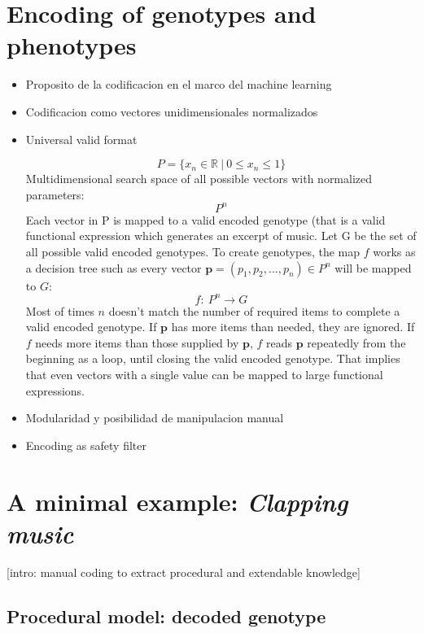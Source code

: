 \documentclass{article}
\renewcommand{\vec}[1]{\mathbf{#1}}
\begin{document}


\section{Encoding of genotypes and phenotypes}
\begin{itemize}
\item Proposito de la codificacion en el marco del machine learning
\item Codificacion como vectores unidimensionales normalizados
\item Universal valid format

$$ P = \{x_n \in \mathbb{R} \: | \: 0 \leq x_n \leq1 \} $$
Multidimensional search space of all possible vectors with normalized parameters:
$$ P^n $$
Each vector in P is mapped to a valid encoded genotype (that is a valid functional expression which generates an excerpt of music.
Let G be the set of all possible valid encoded genotypes. To create genotypes, the map $f$ works as a decision tree such as every vector $\vec{p} = (p_1, p_2, ..., p_n) \in P^n$ will be mapped to $G$: 
$$f:\ P^n\to G$$
Most of times $n$ doesn't match the number of required items to complete a valid encoded genotype. If $\vec{p}$ has more items than needed, they are ignored. If $f$ needs more items than those supplied by $\vec{p}$, $f$ reads $\vec{p}$ repeatedly from the beginning as a loop, until closing the valid encoded genotype. That implies that even vectors with a single value can be mapped to large functional expressions.  

\item Modularidad y posibilidad de manipulacion manual
\item Encoding as safety filter

\end{itemize}





\section{A minimal example: \textsl{Clapping music}}

[intro: manual coding to extract procedural and extendable knowledge] 

\subsection{Procedural model: decoded genotype}
\end{document}
